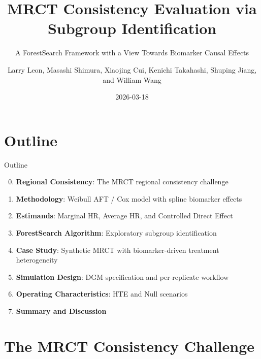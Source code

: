 \documentclass[
  ignorenonframetext,
  aspectratio=169]{beamer}
\title{MRCT Consistency Evaluation via Subgroup Identification}
\subtitle{A ForestSearch Framework with a View Towards Biomarker Causal
Effects}
\author{Larry Leon, Masashi Shimura, Xiaojing Cui, Kenichi Takahashi,
Shuping Jiang, and William Wang}
\date{2026-03-18}
\providecommand{\tightlist}{%
  \setlength{\itemsep}{0pt}\setlength{\parskip}{0pt}}
\begin{document}
\frame{\titlepage}

\section{Outline}\label{outline}

\begin{frame}{Outline}
\begin{enumerate}
\setcounter{enumi}{-1}
\tightlist
\item
  \textbf{Regional Consistency}: The MRCT regional consistency challenge
\item
  \textbf{Methodology}: Weibull AFT / Cox model with spline biomarker
  effects
\item
  \textbf{Estimands}: Marginal HR, Average HR, and Controlled Direct
  Effect
\item
  \textbf{ForestSearch Algorithm}: Exploratory subgroup identification
\item
  \textbf{Case Study}: Synthetic MRCT with biomarker-driven treatment
  heterogeneity
\item
  \textbf{Simulation Design}: DGM specification and per-replicate
  workflow
\item
  \textbf{Operating Characteristics}: HTE and Null scenarios
\item
  \textbf{Summary and Discussion}
\end{enumerate}
\end{frame}

\section{The MRCT Consistency
Challenge}\label{the-mrct-consistency-challenge}
\end{document}
